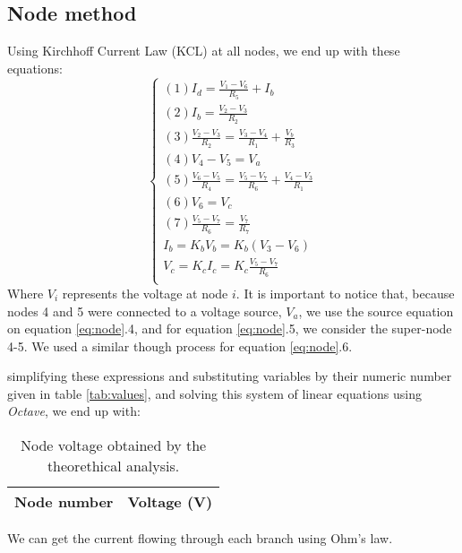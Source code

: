 \subsection{Node method}
Using Kirchhoff Current Law (KCL) at all nodes, we end up with these equations:
\begin{equation}\label{eq:node}
  \begin{cases}
  (1) I_d = \frac{V_1 - V_6}{R_5} + I_b \\
  (2) I_b = \frac{V_2 - V_3}{R_2} \\
  (3) \frac{V_2 - V_3}{R_2} = \frac{V_3 - V_4}{R_1} + \frac{V_b}{R_3} \\
  (4) V_4 - V_5 = V_a \\
  (5) \frac{V_6 - V_5}{R_4} = \frac{V_5 - V_7}{R_6} + \frac{V_4 - V_3}{R_1} \\ %
  (6) V_6 = V_c \\
  (7) \frac{V_5 - V_7}{R_6} = \frac{V_7}{R_7} \\
  I_b = K_bV_b = K_b(V_3 - V_6) \\
  V_c = K_cI_c = K_c \frac{V_5 - V_7}{R_6} \\
\end{cases}
\end{equation}
Where $V_i$ represents the voltage at node $i$. It is important to notice that, because nodes 4 and 5 were connected to a voltage source, $V_a$, we use the source equation on equation \ref{eq:node}.4, and for equation \ref{eq:node}.5, we consider the super-node 4-5. We used a similar though process for equation \ref{eq:node}.6.
\par
simplifying these expressions and substituting variables by their numeric number given in table \ref{tab:values}, and solving this system of linear equations using \textit{Octave}, we end up with:
\begin{table}[H]
  \centering
  \begin{tabular}{|l|r|}
    \hline    
    {\bf Node number} & {\bf Voltage (V)} \\ \hline
    
  \end{tabular}
  \caption{Node voltage obtained by the theorethical analysis.}
  \label{tab:node}
\end{table}
\par
We can get the current flowing through each branch using Ohm's law.

